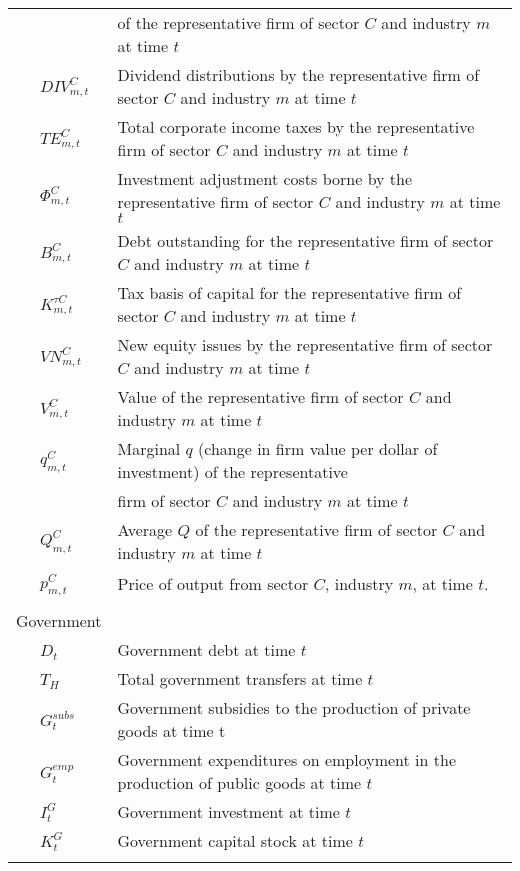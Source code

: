\documentclass[letterpaper,12pt]{article}
\theoremstyle{definition}
\begin{document}
\begin{table}[h!]
\begin{tabular}{ll}
    				& of the representative firm of sector $C$ and industry $m$ at time $t$ \\
    \ \ \ $DIV^{C}_{m,t}$ & Dividend distributions by the representative firm of sector $C$ and industry $m$ at time $t$ \\
    \ \ \ $TE^{C}_{m,t}$ & Total corporate income taxes by the representative firm of sector $C$ and industry $m$ at time $t$ \\
    \ \ \ $\Phi^{C}_{m,t}$ & Investment adjustment costs borne by the representative firm of sector $C$ and industry $m$ at time $t$ \\
    \ \ \ $B^{C}_{m,t}$ & Debt outstanding for the representative firm of sector $C$ and industry $m$ at time $t$ \\
    \ \ \ $K^{\tau C}_{m,t}$ & Tax basis of capital for the representative firm of sector $C$ and industry $m$ at time $t$ \\
    \ \ \ $VN^{C}_{m,t}$ & New equity issues by the representative firm of sector $C$ and industry $m$ at time $t$ \\
    \ \ \ $V^{C}_{m,t}$ & Value of the representative firm of sector $C$ and industry $m$ at time $t$ \\
    \ \ \ $q^{C}_{m,t}$ & Marginal $q$ (change in firm value per dollar of investment) of the representative \\
    			&  firm of sector $C$ and industry $m$ at time $t$ \\
    \ \ \ $Q^{C}_{m,t}$ & Average $Q$ of the representative firm of sector $C$ and industry $m$ at time $t$ \\
    \ \ \ $p^{C}_{m,t}$ & Price of output from sector $C$, industry $m$, at time $t$. \\
          &  \\
    Government &  \\
    \ \ \ $D_{t}$ & Government debt at time $t$ \\
    \ \ \ $T_{H}$ & Total government transfers at time $t$ \\
    \ \ \ $G^{subs}_{t}$ & Government subsidies to the production of private goods at time {t} \\
    \ \ \ $G^{emp}_{t}$ & Government expenditures on employment in the production of public goods at time $t$ \\
    \ \ \ $I^{G}_{t}$ & Government investment at time $t$ \\
    \ \ \ $K^{G}_{t}$ & Government capital stock at time $t$ \\
          &  \\

\end{tabular}
\end{table}
\end{document}
